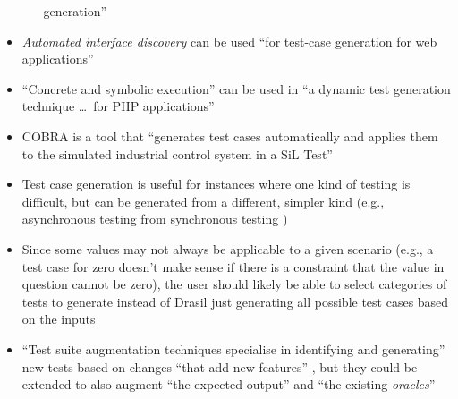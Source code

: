 \begin{itemize}
\begin{itemize}
                    generation'' \citep[p.~345]{LahiriEtAl2013}
          \end{itemize}
    \item \emph{Automated interface discovery} can be used ``for test-case
          generation for web applications'' \citep[p.~184]{DoğanEtAl2014}
    \item ``Concrete and symbolic execution'' can be used in ``a dynamic test
          generation technique \dots\ for PHP applications''
          \citep[p.~192]{DoğanEtAl2014} 
    \item COBRA is a tool that ``generates test cases automatically and
          applies them to the simulated industrial control system in a SiL
          Test'' \citep[p.~2]{PreußeEtAl2012}
    \item Test case generation is useful for instances where one kind of
          testing is difficult, but can be generated from a different,
          simpler kind (e.g., asynchronous testing from synchronous testing
          \citep{JardEtAl1999})
    \item Since some values may not always be applicable to a given scenario
          (e.g., a test case for zero doesn't make sense if there is a
          constraint that the value in question cannot be zero), the user
          should likely be able to select categories of tests to generate
          instead of Drasil just generating all possible test cases based on
          the inputs \citep{june_11_meeting}
    \item ``Test suite augmentation techniques specialise in
          identifying and generating'' new tests based on changes ``that add
          new features'' , but they could be extended to
          also augment ``the expected output'' and ``the existing
          \emph{oracles}'' \citep[p.~516]{BarrEtAl2015}
\end{itemize}

